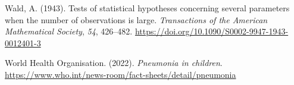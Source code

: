 \documentclass[
]{article}
\newlength{\cslhangindent}
\newlength{\cslentryspacingunit} %
\newenvironment{CSLReferences}[2] %
 {%
  \setlength{\parindent}{0pt}
  \ifodd #1
  \let\oldpar\par
  \def\par{\hangindent=\cslhangindent\oldpar}
  \fi
  \setlength{\parskip}{#2\cslentryspacingunit}
 }%
 {}
\begin{document}
\begin{CSLReferences}{1}{1}
\leavevmode{}%
Wald, A. (1943). Tests of statistical hypotheses concerning several
parameters when the number of observations is large. \emph{Transactions
of the American Mathematical Society}, \emph{54}, 426--482.
\url{https://doi.org/10.1090/S0002-9947-1943-0012401-3}

\leavevmode{}%
World Health Organisation. (2022). \emph{Pneumonia in children}.
\url{https://www.who.int/news-room/fact-sheets/detail/pneumonia}

\end{CSLReferences}
\end{document}
